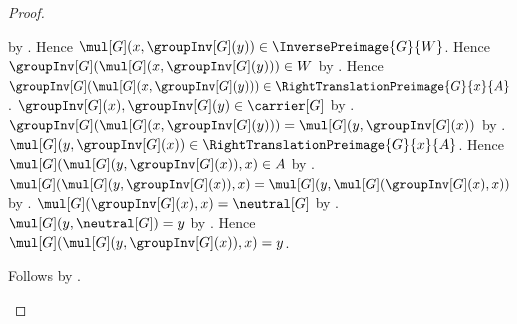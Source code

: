 \begin{proof}
\begin{subproof}
\begin{subproof}
\begin{subproof}
                    by .
                Hence $\mul[G](x,\groupInv[G](y))
                    \in\InversePreimage{G}{W}$.
                Hence $\groupInv[G](\mul[G](x,\groupInv[G](y)))
                    \in W$ by .
                Hence $\groupInv[G](\mul[G](x,\groupInv[G](y)))
                    \in\RightTranslationPreimage{G}{x}{A}$.
                $\groupInv[G](x),\groupInv[G](y)\in\carrier[G]$
                    by .
                $\groupInv[G](\mul[G](x,\groupInv[G](y)))
                    =\mul[G](y,\groupInv[G](x))$
                    by .
                $\mul[G](y,\groupInv[G](x))
                    \in\RightTranslationPreimage{G}{x}{A}$.
                Hence
                    $\mul[G](\mul[G](y,\groupInv[G](x)),x)\in A$
                    by .
                $\mul[G](\mul[G](y,\groupInv[G](x)),x)
                    =\mul[G](y,\mul[G](\groupInv[G](x),x))$
                    by .
                $\mul[G](\groupInv[G](x),x)=\neutral[G]$
                    by .
                $\mul[G](y,\neutral[G])=y$ by .
                Hence $\mul[G](\mul[G](y,\groupInv[G](x)),x)=y$.
            \end{subproof}
        \end{subproof}
        Follows by .
    \end{subproof}


\end{proof}
